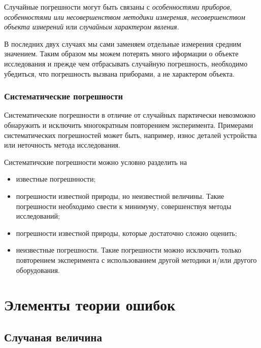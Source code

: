 \documentclass[12pt]{article}
\begin{document}
        Случайные погрешности могут быть связаны с \textit{особенностями приборов},
        \textit{особенностями или несовершенством методики измерения},
        \textit{несовершенством объекта измерений} или \textit{случайным характером явления}.

        В последних двух случаях мы сами заменяем отдельные измерения средним значением.
        Таким образом мы можем потерять много иформации о объекте исследования и
        прежде чем отбрасывать случайную погрешность, необходимо убедиться, что
        погрешность вызвана приборами, а не характером объекта.

      \subsubsection{Систематические погрешности}

        Систематические погрешности в отличие от случайных парктически невозможно
        обнаружить и исключить многократным повторением эксперимента. Примерами систематических
        погрешностей может быть, например, износ деталей устройства или неточность
        метода исследования.

        Систематичские погрешности можно условно разделить на

        \begin{itemize}

          \item известные погрешнности;

          \item погрешности известной природы, но неизвестной величины. Такие погрешности
          необходимо свести к минимуму, совершенствуя методы исследований;

          \item погрешности известной природы, которые достаточно сложно оценить;

          \item неизвестные погрешности. Такие погрешности можно исключить только
          повторением эксперимента с использованием другой методики и/или другого
          оборудования.

        \end{itemize}

  \section{Элементы теории ошибок}

    \subsection{Случаная величина}
\end{document}
